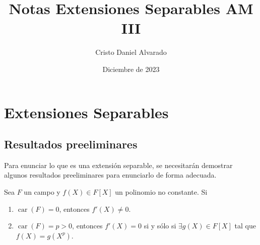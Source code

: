 \documentclass[12pt]{report}
\theoremstyle{largebreak}
\DeclareMathOperator{\car}{car}
\begin{document}
    \title{Notas Extensiones Separables AM III}
    \author{Cristo Daniel Alvarado}
    \date{Diciembre de 2023}
    \maketitle

    \tableofcontents %

    \setcounter{chapter}{3} %
    
    \chapter{Extensiones Separables}
    
    \section{Resultados preeliminares}
    
    Para enunciar lo que es una extensión separable, se necesitarán demostrar algunos resultados preeliminares para enunciarlo de forma adecuada.

    \begin{propo}
        Sea $F$ un campo y $f(X)\in F[X]$ un polinomio no constante. Si
        \begin{enumerate}
            \item $\car(F)=0$, entonces $f'(X)\neq0$. \label{F_1}
            \item $\car(F)=p>0$, entonces $f'(X)=0$  si y sólo si $\exists g(X)\in F[X]$ tal que $f(X)=g(X^{p})$. \label{F_2}
        \end{enumerate}
    \end{propo}
\end{document}
